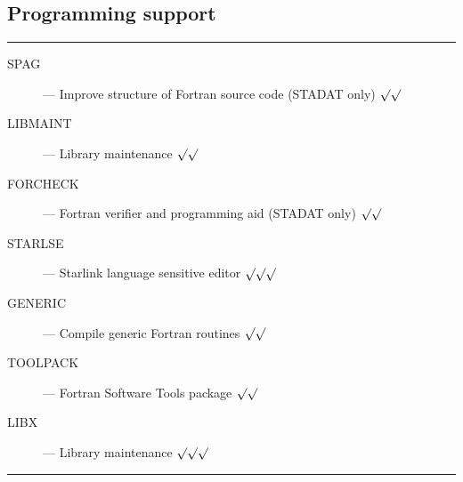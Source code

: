 \subsection{Programming support}

\rule{\textwidth}{0.5mm}
\begin{description}
\begin{description}
\item [SPAG] --- Improve structure of Fortran source code (STADAT only) \hfill
 $\surd\surd$
\item [LIBMAINT] --- Library maintenance \hfill $\surd\surd$
\item [FORCHECK] --- Fortran verifier and programming aid (STADAT only) \hfill
 $\surd\surd$
\item [STARLSE] --- Starlink language sensitive editor \hfill $\surd\surd\surd$
\item [GENERIC] --- Compile generic Fortran routines \hfill $\surd\surd$
\item [TOOLPACK] --- Fortran Software Tools package \hfill $\surd\surd$
\item [LIBX] --- Library maintenance \hfill $\surd\surd\surd$
\end{description}
\end{description}
\rule{\textwidth}{0.5mm}

